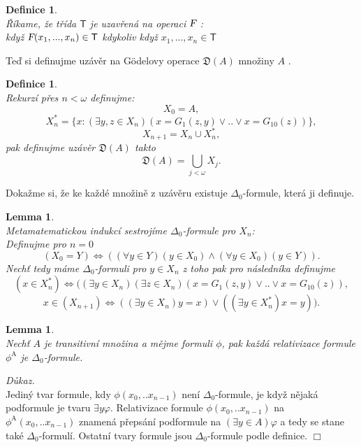 \documentclass[12pt,a4paper]{article}
\newtheorem{lemma}[veta]{Lemma}
\newtheorem{definice}[veta]{Definice}
\newenvironment{proof}
{\noindent \textit{D\r{u}kaz.}}
{\hspace*{\fill} $\Box$}
\begin{document}
\begin{definice}
~\\
\v{R}\'{i}kame, \v{z}e t\v{r}\'{i}da $ \textsf{T} $ je uzav\v{r}en\'{a} na operaci $ \textsl{F}  $ :\\ 
kdy\v{z} $ \textsl{F}(x_1,...,x_n) \in \textsf{T}  $ kdykoliv kdy\v{z} $x_1,...,x_n \in \textsf{T}  $
\end{definice}
\newpage
Te\v{d} si definujme uz\'{a}v\v{e}r na G\"{o}delovy operace $ \mathfrak{D}(A) $ mno\v{z}iny $ A $ .
\begin{definice}
~\\
\label{def:obal}
Rekurz\'{i} p\v{r}es $ n < \omega $ definujme:
\[ X_0=A,  \]
\[ X^*_{n}=\{x:(\exists y,z \in X_n)(x=G_1(z,y) \vee .. \vee x=G_{10}(z))\},  \]
\[ X_{n+1}= X_n \cup X^*_{n}  , \]
pak definujme uz\'{a}v\v{e}r $ \mathfrak{D}(A)$ takto
\[ \mathfrak{D}(A)=\bigcup_{j < \omega}   X_j .\]
\end{definice}  
Doka\v{z}me si, \v{z}e ke ka\v{z}d\'{e} mno\v{z}in\v{e} z uz\'{a}v\v{e}ru existuje $\Delta_0$-formule, kter\'{a} ji definuje.  
\begin{lemma}
~\\
Metamatematickou indukc\'{i} sestroj\'{i}me $\Delta_0$-formule pro $ X_n $: \\
Definujme pro $ n=0 $
\[ (X_0=Y) \Leftrightarrow ((\forall y \in Y)( y\in X_0) \wedge  (\forall y \in X_0)( y\in Y)). \]
Nech\v{t} tedy m\'{a}me $\Delta_0$-formuli pro $ y \in X_{n}  $ z toho pak pro n\'{a}sledn\'{i}ka definujme
\[ (x \in X^*_n) \Leftrightarrow ((\exists y \in X_{n}) (\exists z \in X_{n})(x=G_1(z,y) \vee .. \vee x=G_{10}(z)), \]
\[ x \in (X_{n+1}) \Leftrightarrow ((\exists y \in X_{n}) y=x) \vee ((\exists y \in X^*_n) x=y)) . \]
\label{lem:abs}
\end{lemma}
\begin{lemma}
~\\
Nech\v{t} $ A $ je transitivn\'{i} mno\v{z}ina a m\v{e}jme formuli $ \phi $, pak ka\v{z}d\'{a} relativizace formule $ \phi^\mathrm{A} $ je $\Delta_0$-formule.
\label{lem:reldel}
\end{lemma}
\begin{proof}~\\
Jedin\'{y} tvar formule, kdy $  \phi(x_0,..x_{n-1}) $ nen\'{i} $\Delta_0$-formule, je kdy\v{z} n\v{e}jak\'{a} podformule je tvaru $\exists y \varphi$. Relativizace formule $  \phi(x_0,..x_{n-1}) $ na $ \phi^\mathrm{A}(x_0,..x_{n-1}) $ znamen\'{a} p\v{r}eps\'{a}n\'{i} podformule na $(\exists y\in A)  \varphi$ a tedy se stane tak\'{e} $\Delta_0$-formul\'{i}. Ostatn\'{i} tvary formule jsou $\Delta_0$-formule podle definice.
\end{proof}
\end{document}
